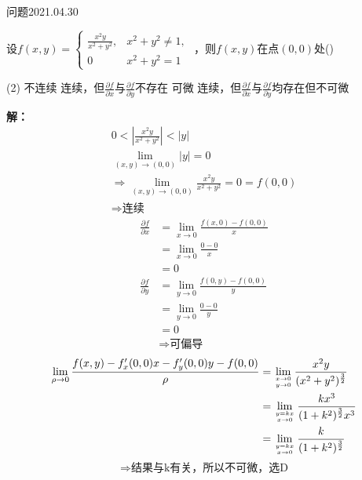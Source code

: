 \begin{mybox}{问题2021.04.30}
	
	\qquad 设$f(x,y)= \begin{cases}
		
		\frac{x^2y}{x^2+y^2},&x^2+y^2\ne 1,\\
		
		0&
		
		x^2+y^2=1
		
	\end{cases}$ ，则$f(x,y)$在点$(0,0)$处() 
	
	\begin{tasks}(2)
		\task 不连续
		\task 连续，但$\frac{\partial{f}}{\partial{x}}$与$\frac{\partial{f}}{\partial{y}}$不存在
		\task 可微
		\task 连续，但$\frac{\partial{f}}{\partial{x}}$与$\frac{\partial{f}}{\partial{y}}$均存在但不可微
	\end{tasks}
	
\end{mybox}
\noindent
\textbf{解：}
\begin{gather*}
	0<\left|\frac{x^2y}{x^2+y^2}\right|<\left|y\right|\\
	\lim\limits_{(x,y) \to (0,0)} |y| =0\\
	\Rightarrow \lim\limits_{(x,y)\to (0,0)} \frac{x^2y}{x^2+y^2} =0 =f(0,0)\\
	\Rightarrow \text{连续}
\end{gather*}
\begin{align*}
	\frac{\partial f}{\partial x} &= \lim \limits_{x \to 0} \frac{f(x,0)-f(0,0)}{x}\\
	&= \lim \limits_{x \to 0} \frac{0-0}{x}\\
	&= 0\\
	\frac{\partial f}{\partial y} &= \lim \limits_{y \to 0} \frac{f(0,y)-f(0,0)}{y}\\
	&= \lim \limits_{y \to 0} \frac{0-0}{y}\\
	&= 0\\
	&\Rightarrow \text{可偏导}
\end{align*}
\begin{align*}
	\lim \limits_{\rho \to 0} \frac{f(x,y)-f'_{x}(0,0)x-f'_{y}(0,0)y -f(0,0)}{\rho} &= \lim\limits_{x\to 0 \atop y \to 0} \frac{x^2 y}{(x^2+y^2)^{\frac{3}{2}}}\\
	&= \lim\limits_{y=kx \atop x \to 0} \frac{kx^3}{(1+k^2)^{\frac{3}{2}}x^3}\\
	&=  \lim\limits_{y=kx \atop x \to 0} \frac{k}{(1+k^2)^{\frac{3}{2}}}\\
\end{align*}
$$\Rightarrow \text{结果与k有关，所以不可微，选D}$$